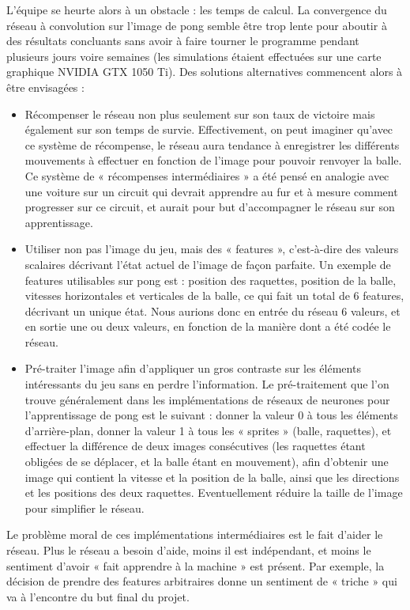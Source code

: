 \documentclass[
    10pt,
    a4paper,
    oneside,
    headinclude,footinclude,
    BCOR=5mm,
    captions=tableabove
]{scrartcl}
\begin{document}
L'équipe se heurte alors à un obstacle : les temps de calcul. La convergence du réseau à convolution sur l’image de pong semble être trop lente pour aboutir à des résultats concluants sans avoir à faire tourner le programme pendant plusieurs jours voire semaines (les simulations étaient effectuées sur une carte graphique NVIDIA GTX 1050 Ti). Des solutions alternatives commencent alors à être envisagées :
\begin{itemize}
	\item Récompenser le réseau non plus seulement sur son taux de victoire mais également sur son temps de survie. Effectivement, on peut imaginer qu’avec ce système de récompense, le réseau aura tendance à enregistrer les différents mouvements à effectuer en fonction de l’image pour pouvoir renvoyer la balle.
	Ce système de « récompenses intermédiaires » a été pensé en analogie avec une voiture sur un circuit qui devrait apprendre au fur et à mesure comment progresser sur ce circuit, et aurait pour but d’accompagner le réseau sur son apprentissage.  %
	\item Utiliser non pas l’image du jeu, mais des « features », c’est-à-dire des valeurs scalaires décrivant l’état actuel de l’image de façon parfaite. Un exemple de features utilisables sur pong est : position des raquettes, position de la balle, vitesses horizontales et verticales de la balle, ce qui fait un total de 6 features, décrivant un unique état. Nous aurions donc en entrée du réseau 6 valeurs, et en sortie une ou deux valeurs, en fonction de la manière dont a été codée le réseau.
	\item Pré-traiter l’image afin d’appliquer un gros contraste sur les éléments intéressants du jeu sans en perdre l’information. Le pré-traitement que l’on trouve généralement dans les implémentations de réseaux de neurones pour l’apprentissage de pong est le suivant : donner la valeur 0 à tous les éléments d’arrière-plan, donner la valeur 1 à tous les « sprites » (balle, raquettes), et effectuer la différence de deux images consécutives (les raquettes étant obligées de se déplacer, et la balle étant en mouvement), afin d’obtenir une image qui contient la vitesse et la position de la balle, ainsi que les directions et les positions des deux raquettes. Eventuellement réduire la taille de l’image pour simplifier le réseau.
\end{itemize}

Le problème moral de ces implémentations intermédiaires est le fait d’aider le réseau. Plus le réseau a besoin d’aide, moins il est indépendant, et moins le sentiment d’avoir « fait apprendre à la machine » est présent. Par exemple, la décision de prendre des features arbitraires donne un sentiment de « triche » qui va à l’encontre du but final du projet. 
\end{document}

